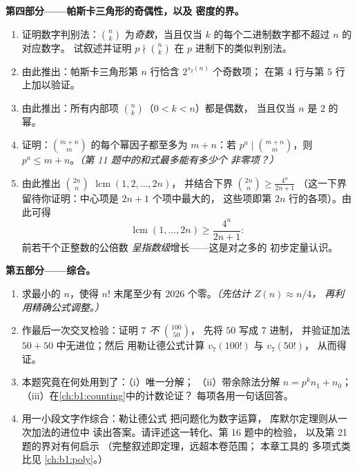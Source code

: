 \begin{problem}
\medskip
\noindent\textbf{第四部分——帕斯卡三角形的奇偶性，以及
密度的界。}
\begin{enumerate}[resume]
  \item 证明数字判别法：$\binom nk$ 为\emph{奇数}，当且仅当
        $k$ 的每个二进制数字都不超过 $n$ 的对应数字。
        试叙述并证明 $p \nmid \binom nk$ 在
        $p$ 进制下的类似判别法。
  \item 由此推出：帕斯卡三角形第 $n$ 行恰含 $2^{s_2(n)}$ 个奇数项；
        在第 $4$ 行与第 $5$ 行上加以验证。
  \item 由此推出：所有内部项 $\binom nk$（$0 < k < n$）都是偶数，
        当且仅当 $n$ 是 $2$ 的幂。
  \item 证明：$\binom{m+n}m$ 的每个幂因子都至多为
        $m + n$：若 $p^a \mid \binom{m+n}m$，则 $p^a \leq
        m + n$。\emph{（第 11 题中的和式最多能有多少个
        非零项？）}
  \item 由此推出 $\binom{2n}n$  $\operatorname{lcm}(1, 2, \dots, 2n)$，
        并结合下界
        $\binom{2n}n \geq \frac{4^n}{2n+1}$
        （这一下界留待你证明：中心项是 $2n + 1$ 个项中最大的，
        这些项即第 $2n$ 行的各项）。由此可得
        \[
        \operatorname{lcm}(1, \dots, 2n) \geq \frac{4^n}{2n+1} :
        \]
        前若干个正整数的公倍数
        \emph{呈指数级}增长——这是对之多的
        初步定量认识。
\end{enumerate}

\medskip
\noindent\textbf{第五部分——综合。}
\begin{enumerate}[resume]
  \item 求最小的 $n$，使得 $n!$ 末尾至少有
        $2026$ 个零。\emph{（先估计 $Z(n) \approx n/4$，
        再利用精确公式调整。）}
  \item 作最后一次交叉检验：证明 $7$ \emph{不} $\binom{100}{50}$，
        先将 $50$ 写成 $7$ 进制，
        并验证加法 $50 + 50$ 中无进位；然后
        用勒让德公式计算 $v_7(100!)$ 与 $v_7(50!)$，
        从而得证。
  \item 本题究竟在何处用到了：（i）唯一分解；
        （ii）带余除法分解 $n = p^k n_1 + n_0$；
        （iii）在\cref{ch:b1:counting}中的计数论证？
        每项各用一句话回答。
  \item 用一小段文字作综合：勒让德公式
        把问题化为数字运算，
        库默尔定理则从一次加法的进位中
        读出答案。请评述这一转化、第 16 题中的检验，
        以及第 21 题的界对有何启示
        （完整叙述即定理，远超本卷范围；
        本章工具的
        多项式类比见
        \cref{ch:b1:poly}。）
\end{enumerate}
\end{problem}
